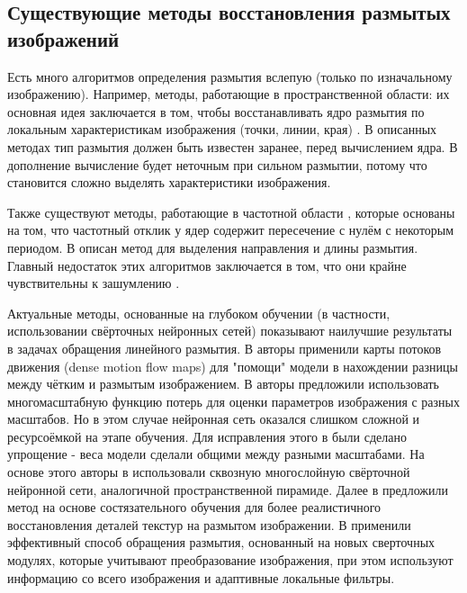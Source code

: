 \subsection{Существующие методы восстановления размытых изображений}
Есть много алгоритмов определения размытия вслепую (только по изначальному изображению). Например, методы, работающие в пространственной области: их основная идея заключается в том, чтобы восстанавливать ядро размытия по локальным характеристикам изображения (точки, линии, края) \cite{kopeika, chalmond, Wu}. В описанных методах тип размытия должен быть известен заранее, перед вычислением ядра. 
В дополнение вычисление будет неточным при сильном размытии, потому что становится сложно выделять характеристики изображения. 

Также существуют методы, работающие в частотной области \cite{rom, cannon}, которые основаны на том, что частотный отклик у ядер содержит пересечение с нулём с некоторым периодом. В \cite{lokh} описан метод для выделения направления и длины размытия. Главный недостаток этих алгоритмов заключается в том, что они крайне чувствительны к зашумлению \cite{kundur}.
\par
Актуальные методы, основанные на глубоком обучении (в частности, использовании свёрточных нейронных сетей) показывают наилучшие результаты в задачах обращения линейного размытия.
В \cite{gong} авторы применили карты потоков движения (dense motion flow maps) для "помощи"  модели в нахождении разницы между чётким и размытым изображением.
В \cite{nah} авторы предложили использовать многомасштабную функцию потерь для оценки параметров изображения с разных масштабов. Но в этом случае нейронная сеть оказался слишком сложной и ресурсоёмкой на этапе обучения.
Для исправления этого в \cite{tao, gao} были сделано упрощение - веса модели сделали общими между разными масштабами.
На основе этого авторы в \cite{zhang} использовали сквозную многослойную свёрточной нейронной сети, аналогичной пространственной пирамиде.
Далее в \cite{dganv2} предложили метод на основе состязательного обучения для более реалистичного восстановления деталей текстур на размытом изображении.
В \cite{suin} применили эффективный способ обращения размытия, основанный на новых сверточных модулях, которые учитывают преобразование изображения, при этом используют информацию со всего изображения и адаптивные локальные фильтры.

